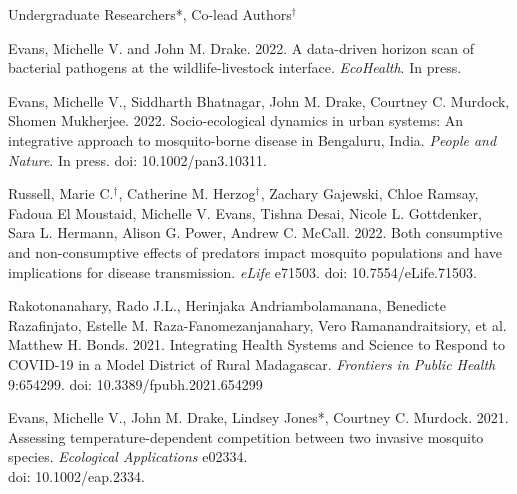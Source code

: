 


\bigskip
Undergraduate Researchers*, Co-lead Authors$^\dagger$

\smallskip

\begin{etaremune}

\item \textcolor{awesome}{Evans, Michelle V.} and John M. Drake. 2022. A data-driven horizon scan of bacterial pathogens at the wildlife-livestock interface. \textit{EcoHealth}. In press. \smallskip

\item \textcolor{awesome}{Evans, Michelle V.}, Siddharth Bhatnagar, John M. Drake, Courtney C. Murdock, Shomen Mukherjee. 2022. Socio-ecological dynamics in urban systems: An integrative approach to mosquito-borne disease in Bengaluru, India. \textit{People and Nature}. In press. doi: 10.1002/pan3.10311. \smallskip

\item Russell, Marie C.$^\dagger$, Catherine M. Herzog$^\dagger$, Zachary Gajewski, Chloe Ramsay, Fadoua El Moustaid, \textcolor{awesome}{Michelle V. Evans}, Tishna Desai, Nicole L. Gottdenker, Sara L. Hermann, Alison G. Power, Andrew C. McCall. 2022. Both consumptive and non-consumptive effects of predators impact mosquito populations and have implications for disease transmission. \textit{eLife} e71503. doi: 10.7554/eLife.71503. \smallskip

\item Rakotonanahary, Rado J.L., Herinjaka Andriambolamanana, Benedicte Razafinjato, Estelle M. Raza-Fanomezanjanahary, Vero Ramanandraitsiory, et al. Matthew H. Bonds. 2021. Integrating Health Systems and Science to Respond to COVID-19 in a Model District of Rural Madagascar. \textit{Frontiers in Public Health} 9:654299. doi: 10.3389/fpubh.2021.654299 \smallskip

\item \textcolor{awesome}{Evans, Michelle V.}, John M. Drake, Lindsey Jones*, Courtney C. Murdock. 2021. Assessing temperature-dependent competition between two invasive mosquito species. \textit{Ecological Applications} e02334. \\ doi: 10.1002/eap.2334. \smallskip


\end{etaremune}
